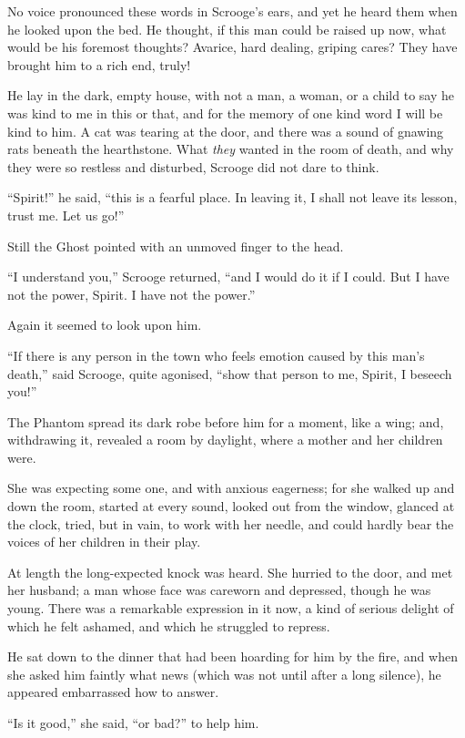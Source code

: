 \documentclass[paper=5.5in:8.5in,BCOR=7mm,twoside,DIV=calc,12pt,usegeometry]{scrbook} %
\begin{document}
No voice pronounced these words in Scrooge's ears, and yet he heard them when he looked upon the bed. He thought, if this man could be raised up now, what would be his foremost thoughts? Avarice, hard dealing, griping cares? They have brought him to a rich end, truly!

He lay in the dark, empty house, with not a man, a woman, or a child to say he was kind to me in this or that, and for the memory of one kind word I will be kind to him. A cat was tearing at the door, and there was a sound of gnawing rats beneath the hearthstone. What \textit{they} wanted in the room of death, and why they were so restless and disturbed, Scrooge did not dare to think.

\enquote{Spirit!} he said, \enquote{this is a fearful place. In leaving it, I shall not leave its lesson, trust me. Let us go!}

Still the Ghost pointed with an unmoved finger to the head.

\enquote{I understand you,} Scrooge returned, \enquote{and I would do it if I could. But I have not the power, Spirit. I have not the power.}

Again it seemed to look upon him.

\enquote{If there is any person in the town who feels emotion caused by this man's death,} said Scrooge, quite agonised, \enquote{show that person to me, Spirit, I beseech you!}

The Phantom spread its dark robe before him for a moment, like a wing; and, withdrawing it, revealed a room by daylight, where a mother and her children were.

She was expecting some one, and with anxious eagerness; for she walked up and down the room, started at every sound, looked out from the window, glanced at the clock, tried, but in vain, to work with her needle, and could hardly bear the voices of her children in their play.

At length the long-expected knock was heard. She hurried to the door, and met her husband; a man whose face was careworn and depressed, though he was young. There was a remarkable expression in it now, a kind of serious delight of which he felt ashamed, and which he struggled to repress.

He sat down to the dinner that had been hoarding for him by the fire, and when she asked him faintly what news (which was not until after a long silence), he appeared embarrassed how to answer.

\enquote{Is it good,} she said, \enquote{or bad?} to help him.
\end{document}
